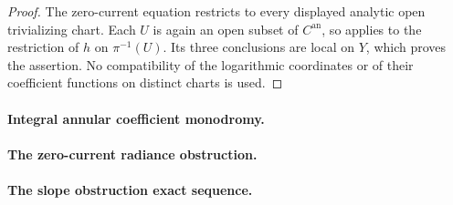 \begin{proof}
The zero-current equation restricts to every displayed analytic open
trivializing chart.  Each \(U\) is again an open subset of
\(C^{\mathrm{an}}\), so
 applies to the
restriction of \(h\) on \(\pi^{-1}(U)\).  Its three conclusions are local
on \(Y\), which proves the assertion.  No compatibility of the logarithmic
coordinates or of their coefficient functions on distinct charts is used.
\end{proof}

\paragraph{Integral annular coefficient monodromy.}



\paragraph{The zero-current radiance obstruction.}



\paragraph{The slope obstruction exact sequence.}



